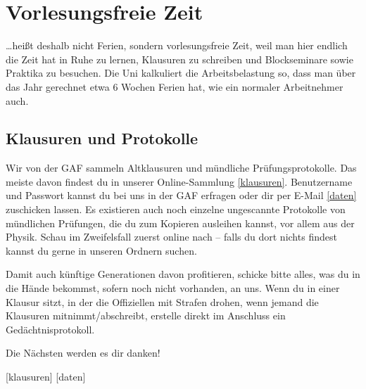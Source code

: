 \chapter{Vorlesungsfreie Zeit}

\ldots heißt deshalb nicht Ferien, sondern vorlesungsfreie Zeit, weil man hier
endlich die Zeit hat in Ruhe zu lernen, Klausuren zu schreiben und
Blockseminare sowie Praktika zu besuchen. Die Uni kalkuliert die
Arbeitsbelastung so, dass man über das Jahr gerechnet etwa 6 Wochen Ferien hat, wie
ein normaler Arbeitnehmer auch.

\section{Klausuren und Protokolle}
Wir von der GAF sammeln Altklausuren und mündliche Prüfungsprotokolle. Das
meiste davon findest du in unserer Online-Sammlung \ref{klausuren}.
Benutzername und Passwort kannst du bei uns in der GAF erfragen oder dir per
E-Mail \ref{daten} zuschicken lassen.  Es existieren auch noch einzelne
ungescannte Protokolle von mündlichen Prüfungen, die du zum Kopieren ausleihen
kannst, vor allem aus der Physik. Schau im Zweifelsfall zuerst online nach --
falls du dort nichts findest kannst du gerne in unseren Ordnern suchen.

Damit auch künftige Generationen davon profitieren, schicke bitte alles,
was du in die Hände bekommst, sofern noch nicht vorhanden, an uns.
Wenn du in einer Klausur sitzt, in der die Offiziellen mit Strafen
drohen, wenn jemand die Klausuren mitnimmt/abschreibt, erstelle
direkt im Anschluss ein Gedächtnisprotokoll.

Die Nächsten werden es dir danken!

\begin{urlList}
	[klausuren]
	[daten]
\end{urlList}

